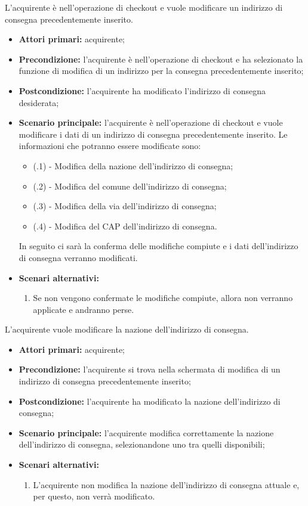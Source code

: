 L'acquirente è nell'operazione di checkout e vuole modificare un indirizzo di consegna precedentemente inserito.
\begin{itemize}
    \item \textbf{Attori primari:} acquirente;
    \item \textbf{Precondizione:} l'acquirente è nell'operazione di checkout e ha selezionato la funzione di modifica di un indirizzo per la consegna precedentemente inserito;
    \item \textbf{Postcondizione:} l'acquirente ha modificato l'indirizzo di consegna desiderata;
    \item \textbf{Scenario principale:} l'acquirente è nell'operazione di checkout e vuole modificare i dati di un indirizzo di consegna precedentemente inserito. Le informazioni che potranno essere modificate sono:
    \begin{itemize}
        \item (\actualUC.1) - Modifica della nazione dell'indirizzo di consegna;
		\item (\actualUC.2) - Modifica del comune dell'indirizzo di consegna;
		\item (\actualUC.3) - Modifica della via dell'indirizzo di consegna;
		\item (\actualUC.4) - Modifica del CAP dell'indirizzo di consegna.
    \end{itemize}
    In seguito ci sarà la conferma delle modifiche compiute e i dati dell'indirizzo di consegna verranno modificati.
    \item \textbf{Scenari alternativi:}
    \begin{enumerate}[label=\lett]
        \item Se non vengono confermate le modifiche compiute, allora non verranno applicate e andranno perse.
    \end{enumerate}
\end{itemize}

\resetSubUC

L'acquirente vuole modificare la nazione dell'indirizzo di consegna.
\begin{itemize}
    \item \textbf{Attori primari:} acquirente;
    \item \textbf{Precondizione:} l'acquirente si trova nella schermata di modifica di un indirizzo di consegna precedentemente inserito;
    \item \textbf{Postcondizione:} l'acquirente ha modificato la nazione dell'indirizzo di consegna;
    \item \textbf{Scenario principale:} l'acquirente modifica correttamente la nazione dell'indirizzo di consegna, selezionandone uno tra quelli disponibili;
    \item \textbf{Scenari alternativi:}
    \begin{enumerate}[label=\lett]
        \item L'acquirente non modifica la nazione dell'indirizzo di consegna attuale e, per questo, non verrà modificato.
    \end{enumerate}
\end{itemize}

